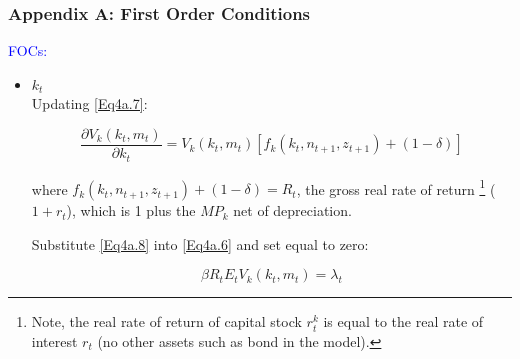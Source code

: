 \begin{frame}
\frametitle{Appendix A: First Order Conditions} \vskip 0.1in
\textcolor{blue}{FOCs:}

\begin{itemize}
\item $k_{t}$\\

Updating \eqref{Eq4a.7}:

\begin{equation}\label{Eq4a.8}
\frac{\partial V_{k}(k_{t},m_{t})}{\partial k_{t}} =
V_{k}(k_{t},m_{t})[f_{k}(k_{t},n_{t+1},z_{t+1})+(1-\delta)]
\end{equation}

where $f_{k}(k_{t},n_{t+1},z_{t+1})+(1-\delta)=R_{t}$, the gross
real rate of return \footnote{Note, the real rate of return of
capital stock $r_{t}^k$ is equal to the real rate of interest
$r_{t}$ (no other assets such as bond in the model).} ($1+r_{t}$),
which is 1 plus the $MP_{k}$ net of depreciation.

\vskip 0.1in

Substitute \eqref{Eq4a.8} into \eqref{Eq4a.6} and set equal to zero:

\begin{equation}\label{Eq4a.9}
\beta R_{t}E_{t} V_{k}(k_{t},m_{t})= \lambda_{t}
\end{equation}

\end {itemize}

\end{frame}

